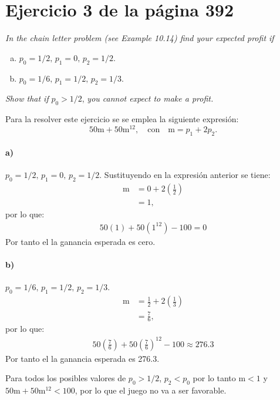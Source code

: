 \documentclass{article}
\begin{document}
\section{Ejercicio 3 de la página 392}	
\textit{In the chain letter problem (see Example 10.14) find your expected profit if}

			\begin{enumerate}[a)]
				\item $p_0 = 1/2, \, p_1 = 0, \, p_2 = 1/2$.
				\item $p_0 = 1/6, \, p_1 = 1/2, \, p_2 = 1/3$.
			\end{enumerate}
		\textit{	Show that if} $p_0 > 1 / 2$,\textit{ you cannot expect to make a profit.}
		
Para la resolver este ejercicio se se emplea la siguiente expresión: 
\begin{equation}
    50\mathrm{m} + 50 \mathrm{m}^{12}, \quad \text{con}\quad  \mathrm{m} = p_1 + 2p_2.
\end{equation}

	
\paragraph{a)} $p_0 = 1/2, \, p_1 = 0, \, p_2 = 1/2$.
 Sustituyendo en la expresión anterior se tiene:
 \begin{align}
     	\mathrm{m} &=0 + 2\left(\frac{1}{2}\right)\\
     	   &=1,
 \end{align}
 por lo que:
  \begin{align}
  50(1)+50(1^{12})-100 =0   
 \end{align}
 Por tanto el la ganancia esperada es cero.

\paragraph{b)} $p_0 = 1/6, \, p_1 = 1/2, \, p_2 = 1/3$.
	 \begin{align}
     	\mathrm{m} &=\frac{1}{2} + 2\left(\frac{1}{3}\right)\\
     	   &=\frac{7}{6},
 \end{align}
 por lo que:
  \begin{align}
  50\left(\frac{7}{6}\right)+50\left(\frac{7}{6}\right)^{12}-100 \approx 276.3
 \end{align}
 Por tanto el la ganancia esperada es 276.3.
 
Para todos los posibles valores de $p_0 > 1 / 2 $, $p_2<p_0$ por lo tanto  $\mathrm{m}<1$ y $50\mathrm{m} + 50 \mathrm{m}^{12}<100$, por lo que el juego no va a ser favorable.
\end{document}
